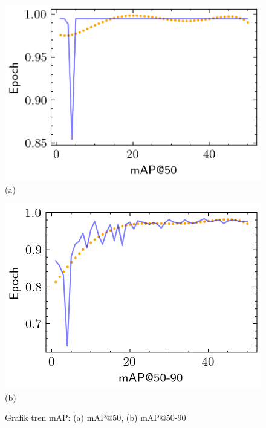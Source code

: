 \begin{figure}[H]
  \centering
  \begin{minipage}[t]{0.48\textwidth}
    \centering
    \includegraphics[width=\textwidth]{gambar/map50.png}
    (a)
  \end{minipage}
  \hfill
  \begin{minipage}[t]{0.48\textwidth}
    \centering
    \includegraphics[width=\textwidth]{gambar/map5090.png}
    (b)
  \end{minipage}
  \caption{Grafik tren mAP: (a) mAP@50, (b) mAP@50-90}
  \label{fig:map}
  \vspace{-1em}
\end{figure}

